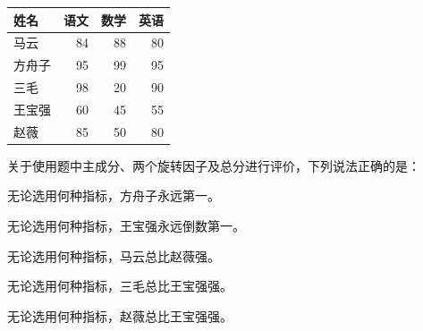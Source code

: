 \par\addvspace{6pt}\noindent\begin{minipage}{\linewidth}


\begin{center}\small\setlength{\tabcolsep}{4pt}\renewcommand{\arraystretch}{1.18}\begin{tabular}{@{}lrrr@{}}
\toprule
姓名 & 语文 & 数学 & 英语 \\
\midrule

马云 & 84 & 88 & 80 \\
方舟子 & 95 & 99 & 95 \\
三毛 & 98 & 20 & 90 \\
王宝强 & 60 & 45 & 55 \\
赵薇 & 85 & 50 & 80 \\
\bottomrule\end{tabular}\end{center}

关于使用题中主成分、两个旋转因子及总分进行评价，下列说法正确的是：


\begin{choices}

\item 无论选用何种指标，方舟子永远第一。

\item 无论选用何种指标，王宝强永远倒数第一。

\item 无论选用何种指标，马云总比赵薇强。

\item 无论选用何种指标，三毛总比王宝强强。

\item 无论选用何种指标，赵薇总比王宝强强。

\end{choices}

\end{minipage}\par\vspace{4pt}

